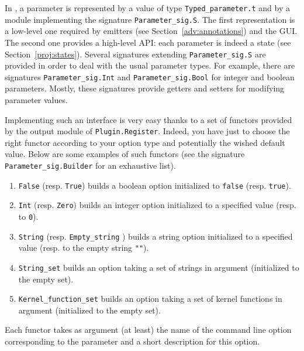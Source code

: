 In \framac, a parameter is represented by a value of type
\texttt{Typed\_parameter.t}
and by a module implementing the signature
\texttt{Parameter\_sig.S}. The first
representation is a low-level one required by emitters (see
Section~\ref{adv:annotations}) and the GUI. The second one provides a high-level
API: each parameter is indeed a state (see
Section~\ref{proj:states}).  Several signatures extending
\texttt{Parameter\_sig.S} are provided in order to deal with the usual parameter
types. For example, there are signatures
\texttt{Parameter\_sig.Int} and
\texttt{Parameter\_sig.Bool} for integer and
boolean parameters. Mostly, these signatures provide getters and setters for
modifying parameter values.

Implementing such an interface is very easy thanks to a set of functors provided
by the output module of
\texttt{Plugin.Register}. Indeed, you have just to
choose the right functor according to your option type and potentially
the wished default value. Below are some examples of such functors
(see the signature
\texttt{Parameter\_sig.Builder} for an
exhaustive list).
\begin{enumerate}
\item \texttt{False}
  (resp. \texttt{True}) builds a
  boolean option initialized to \texttt{false} (resp. \texttt{true}).
\item \texttt{Int}
  (resp. \texttt{Zero}) builds an
  integer option initialized to a specified value (resp. to \texttt{0}).
\item \texttt{String}
  (resp. \texttt{Empty\_string}
  ) builds a string option
  initialized to a specified value (resp. to the empty string \texttt{""}).
\item \texttt{String\_set}
  builds an option taking a set of strings in argument (initialized to the empty
  set).
\item
  \texttt{Kernel\_function\_set}%
 builds an option
taking a set of kernel functions in argument (initialized to the empty set).
\end{enumerate}
Each functor takes as argument (at least) the name of the command line option
corresponding to the parameter and a short description for this option.

